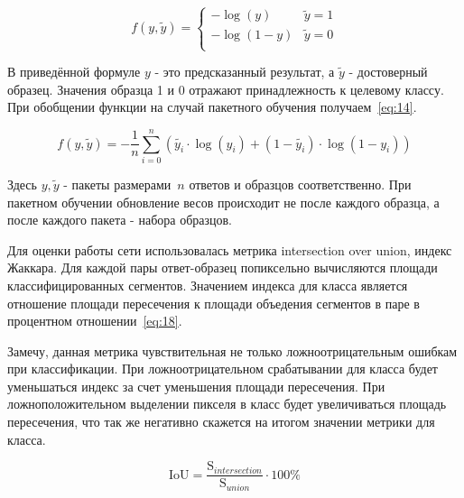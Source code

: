\begin{equation}
    \label{eq:13}
    f(y, \tilde{y}) =
    \begin{cases}
        -\log{(y)} & \tilde{y} = 1 \\
        -\log{(1 - y)} & \tilde{y} = 0 \\
    \end{cases}
\end{equation}

В приведённой формуле $ y $ - это предсказанный результат, а $ \tilde{y} $ - достоверный образец.
Значения образца 1 и 0 отражают принадлежность к целевому классу.
При обобщении функции на случай пакетного обучения получаем~\eqref{eq:14}.

\begin{equation}
    \label{eq:14}
    f(y, \tilde{y}) = -\frac{1}{n}\sum_{i=0}^{n}{(\tilde{y_{i}}\cdot\log{(y_{i})} + (1 - \tilde{y_{i}})\cdot\log{(1 - y_{i})})}
\end{equation}

Здесь $ y, \tilde{y} $ - пакеты размерами~$n$ ответов и образцов соответственно.
При пакетном обучении обновление весов происходит не после каждого образца,
а после каждого пакета - набора образцов.

Для оценки работы сети использовалась метрика intersection over union, индекс Жаккара.
Для каждой пары ответ-образец попиксельно вычисляются площади классифицированных сегментов.
Значением индекса для класса является отношение площади пересечения к площади объедения сегментов в паре в процентном отношении~\eqref{eq:18}.

Замечу, данная метрика чувствительная не только ложноотрицательным ошибкам при классификации.
При ложноотрицательном срабатывании для класса будет уменьшаться индекс за счет уменьшения площади пересечения.
При ложноположительном выделении пикселя в класс будет увеличиваться площадь пересечения, что так же негативно скажется на итогом значении метрики для класса.

\begin{equation}
    \label{eq:18}
    \mathrm{IoU} = \frac{\mathrm{S}_{intersection}}{\mathrm{S}_{union}} \cdot 100 \%
\end{equation}

